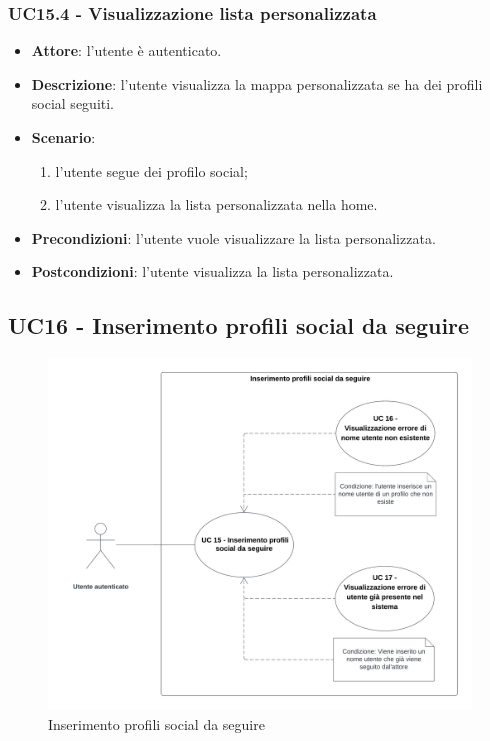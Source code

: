 \subsubsection{UC15.4 - Visualizzazione lista personalizzata}
\begin{itemize}
    \item \textbf{Attore}: l'utente è autenticato.
    \item \textbf{Descrizione}: l'utente visualizza la mappa personalizzata se ha dei profili social seguiti.
    \item \textbf{Scenario}:
    \begin{enumerate}
        \item l'utente segue dei profilo social;
        \item l'utente visualizza la lista personalizzata nella home.
    \end{enumerate}

    \item \textbf{Precondizioni}: l'utente vuole visualizzare la lista personalizzata.
    \item \textbf{Postcondizioni}: l'utente visualizza la lista personalizzata.
\end{itemize}

\subsection{UC16 - Inserimento profili social da seguire}
\begin{figure}[H]
    \includegraphics[width=15cm]{sezioni/Images/UC15.png}
    \centering
    \caption{Inserimento profili social da seguire}
\end{figure}

